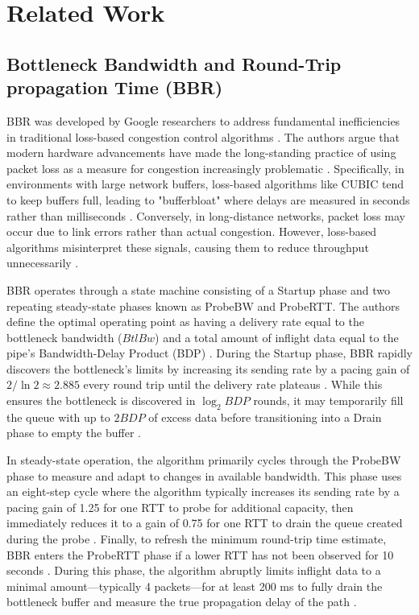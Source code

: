 
\section{Related Work}\label{sec:RelatedWork}

\subsection{Bottleneck Bandwidth and Round-Trip propagation Time (BBR)}

BBR was developed by Google researchers to address fundamental inefficiencies in traditional loss-based congestion control algorithms \cite{BBRORIGINAL}. 
The authors argue that modern hardware advancements have made the long-standing practice of using packet loss as a measure for congestion increasingly problematic \cite{BBRORIGINAL}. 
Specifically, in environments with large network buffers, loss-based algorithms like CUBIC tend to keep buffers full, leading to "bufferbloat" where delays are measured in seconds rather than milliseconds \cite{BBRORIGINAL}. 
Conversely, in long-distance networks, packet loss may occur due to link errors rather than actual congestion.
However, loss-based algorithms misinterpret these signals, causing them to reduce throughput unnecessarily \cite{BBRORIGINAL}.

BBR operates through a state machine consisting of a Startup phase and two repeating steady-state phases known as ProbeBW and ProbeRTT. 
The authors define the optimal operating point as having a delivery rate equal to the bottleneck bandwidth ($BtlBw$) and a total amount of inflight data equal to the pipe's Bandwidth-Delay Product (BDP) \cite{BBRORIGINAL}. 
During the Startup phase, BBR rapidly discovers the bottleneck's limits by increasing its sending rate by a pacing gain of $2/\ln 2 \approx 2.885$ every round trip until the delivery rate plateaus \cite{BBRORIGINAL}.
While this ensures the bottleneck is discovered in $\log_2 BDP$ rounds, it may temporarily fill the queue with up to $2BDP$ of excess data before transitioning into a Drain phase to empty the buffer \cite{BBRORIGINAL, BBREVALUATION}.

In steady-state operation, the algorithm primarily cycles through the ProbeBW phase to measure and adapt to changes in available bandwidth. 
This phase uses an eight-step cycle where the algorithm typically increases its sending rate by a pacing gain of 1.25 for one RTT to probe for additional capacity, then immediately reduces it to a gain of 0.75 for one RTT to drain the queue created during the probe \cite{BBREVALUATION}. 
Finally, to refresh the minimum round-trip time estimate, BBR enters the ProbeRTT phase if a lower RTT has not been observed for 10 seconds \cite{BBREVALUATION}. 
During this phase, the algorithm abruptly limits inflight data to a minimal amount—typically 4 packets—for at least 200 ms to fully drain the bottleneck buffer and measure the true propagation delay of the path \cite{BBRORIGINAL, BBREVALUATION}.

